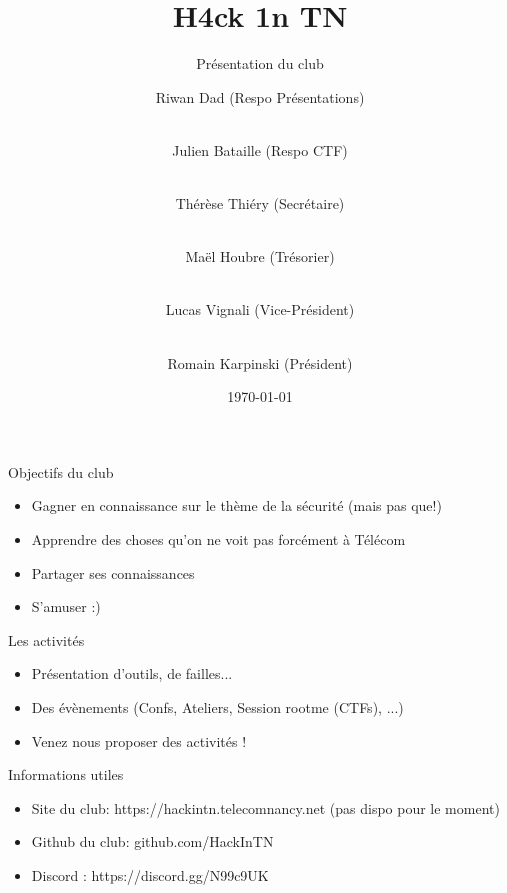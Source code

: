 \documentclass{beamer}
\begin{document}
\title[Présentation]{H4ck 1n TN}
\subtitle{Présentation du club}
\author[H4ck1nTN]{
Riwan Dad (Respo Présentations)
\and \\
Julien Bataille (Respo CTF)
\and \\
Thérèse Thiéry (Secrétaire)
\and \\
Maël Houbre (Trésorier)
\and \\
Lucas Vignali (Vice-Président)
\and \\
Romain Karpinski (Président)
}

\date{\today}



\begin{frame}{Objectifs du club}
	\begin{itemize}
		\item Gagner en connaissance sur le thème de la sécurité (mais pas que!)
		\item Apprendre des choses qu'on ne voit pas forcément à Télécom
		\item Partager ses connaissances
		\item S'amuser :)
	\end{itemize}
	
\end{frame}

\begin{frame}{Les activités}
	\begin{itemize}
		\item Présentation d'outils, de failles...
		\item Des évènements (Confs, Ateliers, Session rootme (CTFs), ...)
		\item Venez nous proposer des activités !
	\end{itemize}
\end{frame}

\begin{frame}{Informations utiles}
	\begin{itemize}
		\item Site du club: https://hackintn.telecomnancy.net (pas dispo pour le moment)
		\item Github du club: github.com/HackInTN
		\item Discord : https://discord.gg/N99c9UK
	\end{itemize}
\end{frame}
\end{document}
